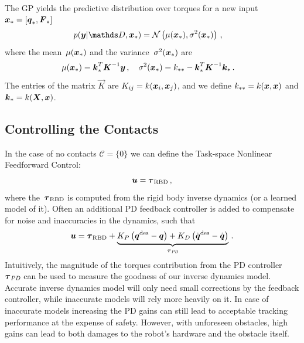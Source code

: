     The GP yields the predictive distribution over torques for a new input $\boldsymbol{x}_* = [\boldsymbol{q}_*, \boldsymbol F_*]$
	\begin{align}
		&\prob(\vec y|\dataset,\parameters_*) = \gauss{\mu(\parameters_*)}{\sigma^2(\parameters_*)}\,, 
		\label{eq:one-step prediction distr}
	\end{align}
	where the mean~$\mu(\boldsymbol{x}_*)$ and the variance~$\sigma^2(\boldsymbol{x}_*)$ are 
	\begin{align}
		&\mu(\boldsymbol{x}_*) = \boldsymbol{k}^T_*\boldsymbol{K}^{-1} \boldsymbol y\,,\quad \sigma^2(\boldsymbol{x}_*) = k_{**}-\boldsymbol{k}^T_*\boldsymbol K^{-1}\boldsymbol{k}_*\,.
		\label{eq:one-step prediction mean and covariance}
	\end{align}
	The entries of the matrix $\vec K$ are  $K_{ij}= k(\boldsymbol{x}_i,\boldsymbol{x}_j)$, and we define $k_{**}=k(\boldsymbol{x},\boldsymbol{x})$ and $\boldsymbol{k}_{*}=k(\boldsymbol{X},\boldsymbol{x})$. 


\subsection{Controlling the Contacts}

In the case of no contacts $\mathcal{C}=\{0\}$ we can define the Task-space Nonlinear Feedforward Control:
%
\begin{align}
	\boldsymbol{u} = \boldsymbol{\tau}_\text{RBD}\,,
\end{align}
%
where the~$\boldsymbol{\tau}_\text{RBD}$ is computed from the rigid body inverse dynamics (or a learned model of it).
Often an additional PD feedback controller is added to compensate for noise and inaccuracies in the dynamics, such that
%
\begin{align}
	\boldsymbol{u} = \boldsymbol{\tau}_\text{RBD} + \underbrace{K_P \left(\boldsymbol q^{\text{des}}-\boldsymbol q\right) + K_D \left(\dot{\boldsymbol q}^{\text{des}} - \dot{\boldsymbol q}\right)}_{\boldsymbol{\tau}_\textit{PD}}\,.
\end{align}
%
Intuitively, the magnitude of the torques contribution from the PD controller~$\boldsymbol{\tau}_\textit{PD}$ can be used to measure the goodness of our inverse dynamics model.
Accurate inverse dynamics model will only need small corrections by the feedback controller, while inaccurate models will rely more heavily on it.
In case of inaccurate models increasing the PD gains can still lead to acceptable tracking performance at the expense of safety.
However, with unforeseen obstacles, high gains can lead to both damages to the robot's hardware and the obstacle itself.

